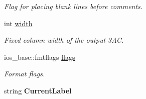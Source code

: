 \begin{DoxyCompactItemize}
\begin{DoxyCompactList}\small\item\em Flag for placing blank lines before comments. \end{DoxyCompactList}\item 
\hypertarget{classTAC__Generator_a1d4defba19014a3804e2f52b01b3a967}{int \hyperlink{classTAC__Generator_a1d4defba19014a3804e2f52b01b3a967}{width}}\label{classTAC__Generator_a1d4defba19014a3804e2f52b01b3a967}

\begin{DoxyCompactList}\small\item\em Fixed column width of the output 3\-A\-C. \end{DoxyCompactList}\item 
\hypertarget{classTAC__Generator_a27703e9823770349f1ba61d0aff651c1}{ios\-\_\-base\-::fmtflags \hyperlink{classTAC__Generator_a27703e9823770349f1ba61d0aff651c1}{flags}}\label{classTAC__Generator_a27703e9823770349f1ba61d0aff651c1}

\begin{DoxyCompactList}\small\item\em Format flags. \end{DoxyCompactList}\item 
\hypertarget{classTAC__Generator_aafdc6d972a2770bc53c2769eb9878af4}{string {\bfseries Current\-Label}}\label{classTAC__Generator_aafdc6d972a2770bc53c2769eb9878af4}

\end{DoxyCompactItemize}
